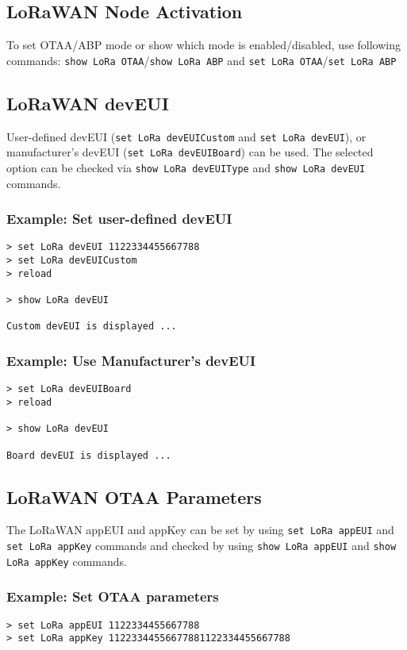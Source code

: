 \subsection{LoRaWAN Node Activation}
To set OTAA/ABP mode or show which mode is enabled/disabled, use following commands: {\tt show LoRa OTAA}/{\tt show LoRa ABP} and {\tt set LoRa OTAA}/{\tt set LoRa ABP}

\subsection{LoRaWAN devEUI}
User-defined devEUI ({\tt set LoRa devEUICustom} and {\tt set LoRa devEUI}), or manufacturer's devEUI ({\tt set LoRa devEUIBoard}) can be used. The selected option can be checked via {\tt show LoRa devEUIType} and {\tt show LoRa devEUI} commands.

\subsubsection*{Example: Set user-defined devEUI}
\begin{Verbatim}[frame=single, fontsize=\small]
> set LoRa devEUI 1122334455667788
> set LoRa devEUICustom
> reload

> show LoRa devEUI

Custom devEUI is displayed ...

\end{Verbatim}

\subsubsection*{Example: Use Manufacturer's devEUI}
\begin{Verbatim}[frame=single, fontsize=\small]
> set LoRa devEUIBoard
> reload

> show LoRa devEUI

Board devEUI is displayed ...
\end{Verbatim}

\subsection{LoRaWAN OTAA Parameters}
The LoRaWAN appEUI and appKey can be set by using {\tt set LoRa appEUI} and {\tt set LoRa appKey} commands and checked by using {\tt show LoRa appEUI} and {\tt show LoRa appKey} commands.
  
\subsubsection*{Example: Set OTAA parameters}
\begin{Verbatim}[frame=single, fontsize=\small]
> set LoRa appEUI 1122334455667788
> set LoRa appKey 11223344556677881122334455667788
\end{Verbatim}
  
